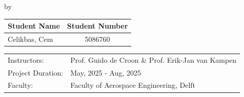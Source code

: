 \begin{titlepage}

\begin{center}

{\makeatletter
\largetitlestyle\fontsize{45}{45}\selectfont\@title
\makeatother}

{\makeatletter
\ifdefvoid{\@subtitle}{}{\bigskip\titlestyle\fontsize{20}{20}\selectfont\@subtitle}
\makeatother}

\bigskip
\bigskip

by

\bigskip
\bigskip

{\makeatletter
\largetitlestyle\fontsize{25}{25}\selectfont\@author
\makeatother}

\bigskip

\setlength\extrarowheight{2pt}
\begin{tabular}{lc}
    Student Name & Student Number \\\midrule
     Celikbas, Cem & 5086760 \\

\end{tabular}

\vfill



\begin{tabular}{ll}
    Instructors: & Prof. Guido de Croon  \& Prof. Erik-Jan van Kampen   \\
    Project Duration: & May, 2025 - Aug, 2025 \\
    Faculty: & Faculty of Aerospace Engineering, Delft
\end{tabular}

\bigskip
\bigskip


\end{center}


\end{titlepage}

